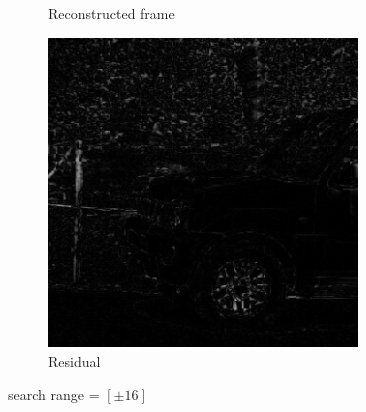 \documentclass{homework}
\begin{document}
\begin{figure}[H]
\begin{subfigure}{0.32\textwidth}
        \caption{Reconstructed frame}
    \end{subfigure}
    \begin{subfigure}{0.32\textwidth}
        \centering
        \includegraphics[width=0.9\textwidth]{8_16_residual.png}
        \caption{Residual}
    \end{subfigure}
    \caption{search range = $[\pm 16]$}
\end{figure}
\end{document}
